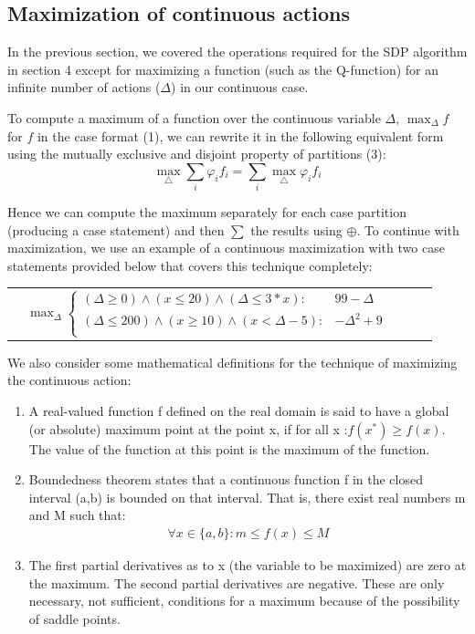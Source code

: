 \documentclass[letterpaper]{article}
\renewcommand{\-}{\text{-}}
\begin{document}
\subsection{Maximization of continuous actions}

In the previous section, we covered the operations required for the SDP algorithm in section 4 except for maximizing a function (such as the Q-function) for an infinite number of actions ($\Delta$) in our continuous case. 

To compute a maximum of a function over the continuous variable $\Delta$, $\max_{\Delta} f $ for $f$
in the case format (1), we can rewrite it in the following equivalent form using the mutually exclusive and disjoint property of partitions (3):
\begin{equation}
\max_{\bigtriangleup}\sum_{i}\varphi_{i}f_{i}=\sum_{i}\max_{\bigtriangleup}\varphi_{i}f_{i}
\end{equation}

Hence we can compute the maximum separately for each case partition (producing a case statement) and then $\sum$ the results using $\oplus$.
To continue with maximization, we use an example of a continuous maximization with two case statements provided below that covers this technique completely:

{\footnotesize
\begin{center}
\begin{tabular}{r c c c l}
&
\hspace{-9mm} $\max_{\Delta}
  \begin{cases}
(\Delta  \geq 0) \wedge (x \leq 20) \wedge (\Delta \leq 3*x) : & 99-\Delta \\ 
(\Delta \leq 200) \wedge (x \geq 10) \wedge (x < \Delta - 5) : & - \Delta^{2} +9 \\ 
  \end{cases}$
\end{tabular}
\end{center}
}
We also consider some mathematical definitions for the technique of maximizing the continuous action: 
\begin{enumerate}
\item A real-valued function f defined on the real domain is said to have a global (or absolute) maximum point at the point x, if for all x :$ f(x^{*}) \geq f(x) $. The value of the function at this point is the maximum of the function.
\item Boundedness theorem states that a continuous function f in the closed interval (a,b) is bounded on that interval. That is, there exist real numbers m and M such that:
\begin{align*}
\forall x \in \{a,b\} : m \leq f(x) \leq M 
\end{align*}
\item The first partial derivatives as to x (the variable to be maximized) are zero at the maximum. The second partial derivatives are negative. These are only necessary, not sufficient, conditions for a maximum because of the possibility of saddle points.
\end{enumerate}
\end{document}

